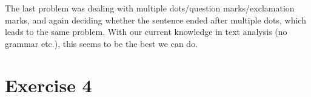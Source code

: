 \documentclass{article}
\begin{document}
The last problem was dealing with multiple dots/question marks/exclamation marks, and again deciding whether the sentence ended after multiple dots, which leads to the same problem. With our current knowledge in text analysis (no grammar etc.), this seems to be the best we can do.

\section*{Exercise 4}
\end{document}
